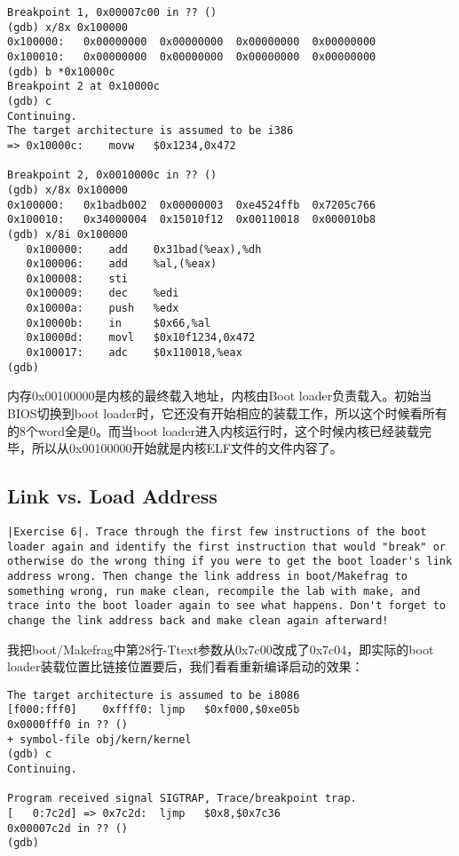 \documentclass{article}
\begin{document}
\begin{CJK*}{UTF8}{gkai}
\begin{lstlisting}[style=console]
Breakpoint 1, 0x00007c00 in ?? ()
(gdb) x/8x 0x100000
0x100000:	0x00000000	0x00000000	0x00000000	0x00000000
0x100010:	0x00000000	0x00000000	0x00000000	0x00000000
(gdb) b *0x10000c
Breakpoint 2 at 0x10000c
(gdb) c
Continuing.
The target architecture is assumed to be i386
=> 0x10000c:	movw   $0x1234,0x472

Breakpoint 2, 0x0010000c in ?? ()
(gdb) x/8x 0x100000
0x100000:	0x1badb002	0x00000003	0xe4524ffb	0x7205c766
0x100010:	0x34000004	0x15010f12	0x00110018	0x000010b8
(gdb) x/8i 0x100000
   0x100000:	add    0x31bad(%eax),%dh
   0x100006:	add    %al,(%eax)
   0x100008:	sti    
   0x100009:	dec    %edi
   0x10000a:	push   %edx
   0x10000b:	in     $0x66,%al
   0x10000d:	movl   $0x10f1234,0x472
   0x100017:	adc    $0x110018,%eax
(gdb) 

\end{lstlisting}

内存0x00100000是内核的最终载入地址，内核由Boot loader负责载入。初始当BIOS切换到boot loader时，它还没有开始相应的装载工作，所以这个时候看所有的8个word全是0。而当boot loader进入内核运行时，这个时候内核已经装载完毕，所以从0x00100000开始就是内核ELF文件的文件内容了。

\subsection{Link vs. Load Address}

\begin{lstlisting}[style=exercise]
|Exercise 6|. Trace through the first few instructions of the boot loader again and identify the first instruction that would "break" or otherwise do the wrong thing if you were to get the boot loader's link address wrong. Then change the link address in boot/Makefrag to something wrong, run make clean, recompile the lab with make, and trace into the boot loader again to see what happens. Don't forget to change the link address back and make clean again afterward!
\end{lstlisting}

我把boot/Makefrag中第28行-Ttext参数从0x7c00改成了0x7c04，即实际的boot loader装载位置比链接位置要后，我们看看重新编译启动的效果：

\begin{lstlisting}[style=console]
The target architecture is assumed to be i8086
[f000:fff0]    0xffff0:	ljmp   $0xf000,$0xe05b
0x0000fff0 in ?? ()
+ symbol-file obj/kern/kernel
(gdb) c
Continuing.

Program received signal SIGTRAP, Trace/breakpoint trap.
[   0:7c2d] => 0x7c2d:	ljmp   $0x8,$0x7c36
0x00007c2d in ?? ()
(gdb) 
\end{lstlisting}


\end{CJK*}
\end{document}
